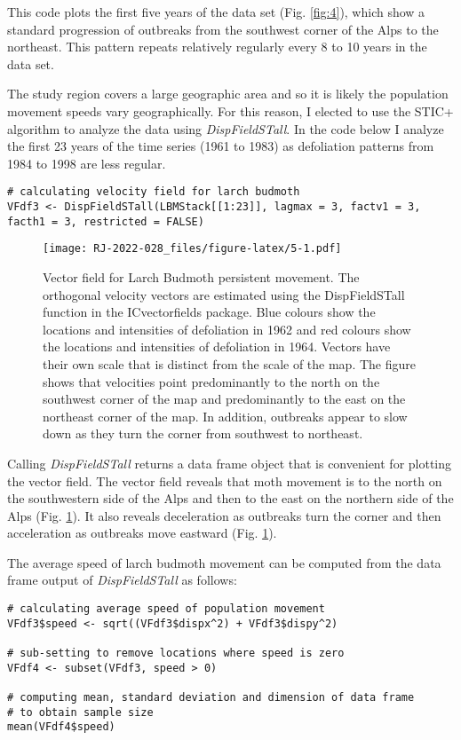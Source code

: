 This code plots the first five years of the data set (Fig. \ref{fig:4}), which show a standard progression of outbreaks from the southwest corner of the Alps to the northeast. This pattern repeats relatively regularly every 8 to 10 years in the data set.

The study region covers a large geographic area and so it is likely the population movement speeds vary geographically. For this reason, I elected to use the STIC+ algorithm to analyze the data using \emph{DispFieldSTall}. In the code below I analyze the first 23 years of the time series (1961 to 1983) as defoliation patterns from 1984 to 1998 are less regular.

\begin{verbatim}
# calculating velocity field for larch budmoth
VFdf3 <- DispFieldSTall(LBMStack[[1:23]], lagmax = 3, factv1 = 3, facth1 = 3, restricted = FALSE)
\end{verbatim}

\begin{figure}
\centering
\texttt{[image: RJ-2022-028\_files/figure-latex/5-1.pdf]}
\caption{\label{fig:5}Vector field for Larch Budmoth persistent movement. The orthogonal velocity vectors are estimated using the DispFieldSTall function in the ICvectorfields package. Blue colours show the locations and intensities of defoliation in 1962 and red colours show the locations and intensities of defoliation in 1964. Vectors have their own scale that is distinct from the scale of the map. The figure shows that velocities point predominantly to the north on the southwest corner of the map and predominantly to the east on the northeast corner of the map. In addition, outbreaks appear to slow down as they turn the corner from southwest to northeast.}
\end{figure}

Calling \emph{DispFieldSTall} returns a data frame object that is convenient for plotting the vector field. The vector field reveals that moth movement is to the north on the southwestern side of the Alps and then to the east on the northern side of the Alps (Fig. \ref{fig:5}). It also reveals deceleration as outbreaks turn the corner and then acceleration as outbreaks move eastward (Fig. \ref{fig:5}).

The average speed of larch budmoth movement can be computed from the data frame output of \emph{DispFieldSTall} as follows:

\begin{verbatim}
# calculating average speed of population movement
VFdf3$speed <- sqrt((VFdf3$dispx^2) + VFdf3$dispy^2)

# sub-setting to remove locations where speed is zero
VFdf4 <- subset(VFdf3, speed > 0)

# computing mean, standard deviation and dimension of data frame
# to obtain sample size
mean(VFdf4$speed)
\end{verbatim}

